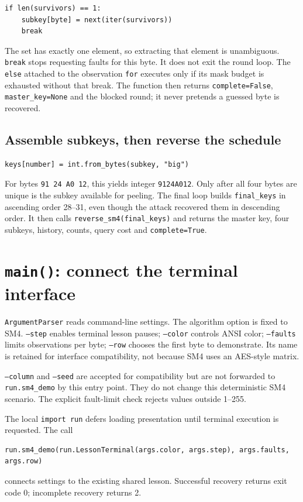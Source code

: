 \documentclass[11pt,a4paper]{article}
\newcommand{\hx}[1]{\texttt{#1}}
\begin{document}
\begin{Verbatim}
if len(survivors) == 1:
    subkey[byte] = next(iter(survivors))
    break
\end{Verbatim}
The set has exactly one element, so extracting that element is unambiguous.
\hx{break} stops requesting faults for this byte. It does not exit the round loop.
The \hx{else} attached to the observation \hx{for} executes only if its mask
budget is exhausted without that break. The function then returns
\hx{complete=False}, \hx{master\_key=None} and the blocked round; it never
pretends a guessed byte is recovered.

\subsection{Assemble subkeys, then reverse the schedule}
\begin{Verbatim}
keys[number] = int.from_bytes(subkey, "big")
\end{Verbatim}
For bytes \hx{91 24 A0 12}, this yields integer \hx{9124A012}.
Only after all four bytes are unique is the subkey available for peeling.
The final loop builds \hx{final\_keys} in ascending order 28--31, even though
the attack recovered them in descending order. It then calls
\hx{reverse\_sm4(final\_keys)} and returns the master key, four subkeys,
history, counts, query cost and \hx{complete=True}.


\section{\texorpdfstring{\texttt{main()}}{main}: connect the terminal interface}
\hx{ArgumentParser} reads command-line settings. The algorithm option is fixed
to SM4. \hx{--step} enables terminal lesson pauses; \hx{--color} controls ANSI
color; \hx{--faults} limits observations per byte; \hx{--row} chooses the first
byte to demonstrate. Its name is retained for interface compatibility, not
because SM4 uses an AES-style matrix.

\hx{--column} and \hx{--seed} are accepted for compatibility but are not forwarded
to \hx{run.sm4\_demo} by this entry point. They do not change this deterministic
SM4 scenario. The explicit fault-limit check rejects values outside 1--255.

The local \hx{import run} defers loading presentation until terminal execution
is requested. The call
\begin{Verbatim}
run.sm4_demo(run.LessonTerminal(args.color, args.step), args.faults, args.row)
\end{Verbatim}
connects settings to the existing shared lesson. Successful recovery returns
exit code 0; incomplete recovery returns 2.
\end{document}
